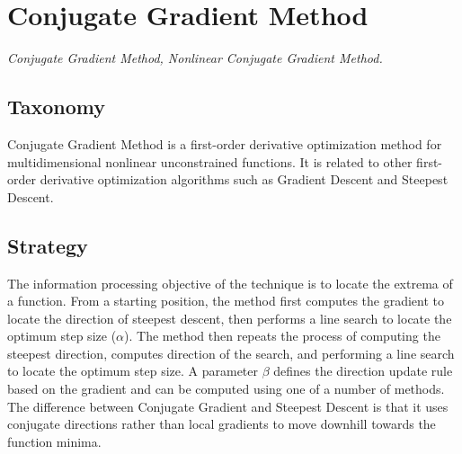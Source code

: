 
\section{Conjugate Gradient Method} 
\label{sec:conjugate_gradient}

\emph{Conjugate Gradient Method, Nonlinear Conjugate Gradient Method.}

\subsection{Taxonomy}
Conjugate Gradient Method is a first-order derivative optimization method for multidimensional nonlinear unconstrained functions.
It is related to other first-order derivative optimization algorithms such as Gradient Descent and Steepest Descent.

\subsection{Strategy}
The information processing objective of the technique is to locate the extrema of a function.
From a starting position, the method first computes the gradient to locate the direction of steepest descent, then performs a line search to locate the optimum step size ($\alpha$). The method then repeats the process of computing the steepest direction, computes direction of the search, and performing a line search to locate the optimum step size. A parameter $\beta$ defines the direction update rule based on the gradient and can be computed using one of a number of methods.
The difference between Conjugate Gradient and Steepest Descent is that it uses conjugate directions rather than local gradients to move downhill towards the function minima.

